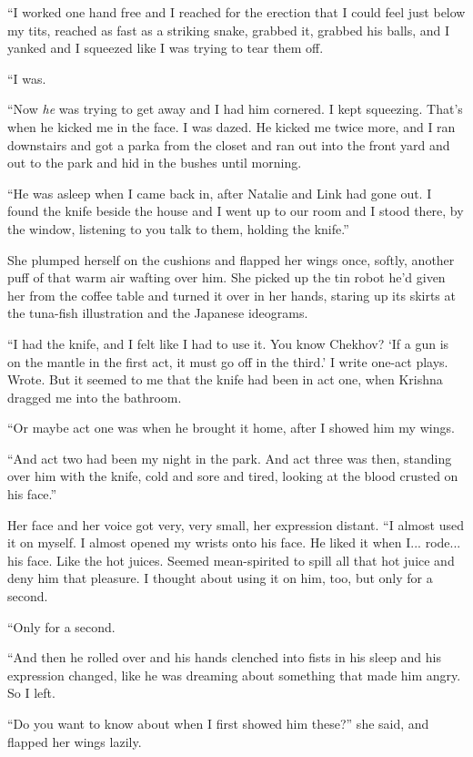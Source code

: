 ``I worked one hand free and I reached for the erection that I could
feel just below my tits, reached as fast as a striking snake, grabbed
it, grabbed his balls, and I yanked and I squeezed like I was trying
to tear them off.

``I was.

``Now \textit{he} was trying to get away and I had him cornered.  I
kept squeezing.  That's when he kicked me in the face.  I was dazed. 
He kicked me twice more, and I ran downstairs and got a parka from the
closet and ran out into the front yard and out to the park and hid in
the bushes until morning.

``He was asleep when I came back in, after Natalie and Link had gone
out.  I found the knife beside the house and I went up to our room and
I stood there, by the window, listening to you talk to them, holding
the knife.''

She plumped herself on the cushions and flapped her wings once,
softly, another puff of that warm air wafting over him.  She picked up
the tin robot he'd given her from the coffee table and turned it over
in her hands, staring up its skirts at the tuna-fish illustration and
the Japanese ideograms.

``I had the knife, and I felt like I had to use it.  You know Chekhov? 
`If a gun is on the mantle in the first act, it must go off in the
third.' I write one-act plays.  Wrote.  But it seemed to me that the
knife had been in act one, when Krishna dragged me into the bathroom.

``Or maybe act one was when he brought it home, after I showed him my
wings.

``And act two had been my night in the park.  And act three was then,
standing over him with the knife, cold and sore and tired, looking at
the blood crusted on his face.''

Her face and her voice got very, very small, her expression distant. 
``I almost used it on myself.  I almost opened my wrists onto his
face.  He liked it when I...  rode...  his face.  Like the hot juices. 
Seemed mean-spirited to spill all that hot juice and deny him that
pleasure.  I thought about using it on him, too, but only for a
second.

``Only for a second.

``And then he rolled over and his hands clenched into fists in his
sleep and his expression changed, like he was dreaming about something
that made him angry.  So I left.

``Do you want to know about when I first showed him these?'' she said,
and flapped her wings lazily.

